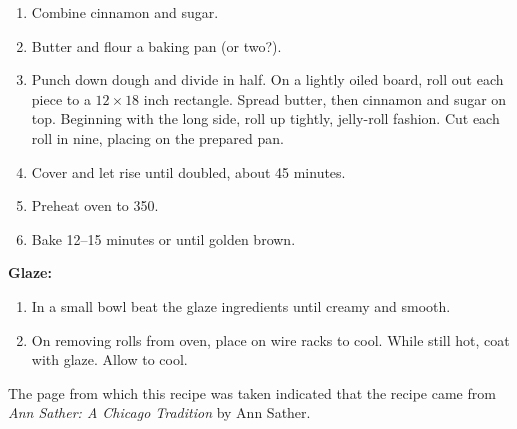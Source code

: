 \begin{recipe}
  \begin{enumerate}

  \item Combine cinnamon and sugar.

  \item Butter and flour a baking pan (or two?).

  \item Punch down dough and divide in half.  On a lightly oiled
    board, roll out each piece to a $12\times 18$ inch rectangle.
    Spread butter, then cinnamon and sugar on top.  Beginning with the
    long side, roll up tightly, jelly-roll fashion.  Cut each roll in
    nine, placing on the prepared pan.

  \item Cover and let rise until doubled, about 45 minutes.

  \item Preheat oven to 350\F.

  \item Bake 12--15 minutes or until golden brown.

  \end{enumerate}
\end{recipe}


\textbf{Glaze:}

\begin{ingredients}
\end{ingredients}


\begin{recipe}
  \begin{enumerate}

  \item In a small bowl beat the glaze ingredients until creamy and
    smooth.

  \item On removing rolls from oven, place on wire racks to cool.
    While still hot, coat with glaze.  Allow to cool.

  \end{enumerate}
\end{recipe}

The page from which this recipe was taken indicated that the recipe
came from \textit{Ann Sather: A Chicago Tradition} by Ann Sather.
